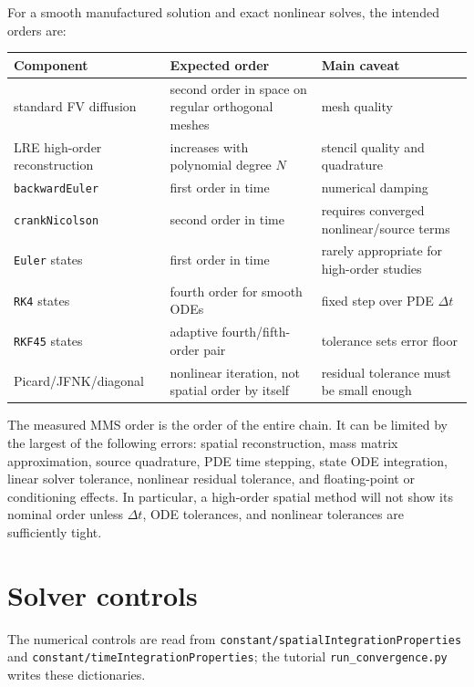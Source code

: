 \documentclass[11pt,a4paper]{article}
\newcommand{\code}[1]{\texttt{\small #1}}
\begin{document}
For a smooth manufactured solution and exact nonlinear solves, the intended
orders are:
\begin{center}
\scriptsize
\begin{tabular}{@{}lll@{}}
Component & Expected order & Main caveat \\
\midrule
standard FV diffusion & second order in space on regular orthogonal meshes & mesh quality \\
LRE high-order reconstruction & increases with polynomial degree $N$ & stencil quality and quadrature \\
\code{backwardEuler} & first order in time & numerical damping \\
\code{crankNicolson} & second order in time & requires converged nonlinear/source terms \\
\code{Euler} states & first order in time & rarely appropriate for high-order studies \\
\code{RK4} states & fourth order for smooth ODEs & fixed step over PDE $\Delta t$ \\
\code{RKF45} states & adaptive fourth/fifth-order pair & tolerance sets error floor \\
Picard/JFNK/diagonal & nonlinear iteration, not spatial order by itself & residual tolerance must be small enough \\
\bottomrule
\end{tabular}
\end{center}
The measured MMS order is the order of the entire chain. It can be limited by
the largest of the following errors: spatial reconstruction, mass matrix
approximation, source quadrature, PDE time stepping, state ODE integration,
linear solver tolerance, nonlinear residual tolerance, and floating-point or
conditioning effects. In particular, a high-order spatial method will not show
its nominal order unless $\Delta t$, ODE tolerances, and nonlinear tolerances
are sufficiently tight.

\section{Solver controls}
\label{sec:solver-controls}

The numerical controls are read from
\code{constant/spatialIntegrationProperties} and
\code{constant/timeIntegrationProperties}; the tutorial
\code{run\_convergence.py} writes these dictionaries.
\end{document}

